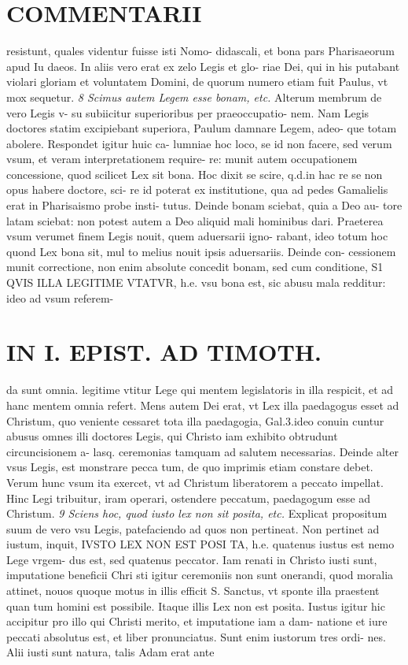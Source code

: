 \documentclass{article}
\begin{document}
\begin{pages}
\section*{COMMENTARII }\pstart resistunt, quales videntur fuisse isti Nomo- didascali, et bona pars Pharisaeorum apud Iu daeos. In aliis vero erat ex zelo Legis et glo- riae Dei, qui in his putabant violari gloriam et voluntatem Domini, de quorum numero etiam fuit Paulus, vt mox sequetur.  \pend
\textit{8 Scimus autem Legem esse bonam, etc. }\pstart Alterum membrum de vero Legis v- su subiicitur superioribus per praeoccupatio- nem. Nam Legis doctores statim excipiebant superiora, Paulum damnare Legem, adeo- que totam abolere. Respondet igitur huic ca- lumniae hoc loco, se id non facere, sed verum vsum, et veram interpretationem require- re: munit autem occupationem concessione, quod scilicet Lex sit bona. Hoc dixit se scire, q.d.in hac re se non opus habere doctore, sci- re id poterat ex institutione, qua ad pedes Gamalielis erat in Pharisaismo probe insti- tutus. Deinde bonam sciebat, quia a Deo au- tore latam sciebat: non potest autem a Deo aliquid mali hominibus dari. Praeterea vsum verumet finem Legis nouit, quem aduersarii igno- rabant, ideo totum hoc quond Lex bona sit, mul to melius nouit ipsis aduersariis. Deinde con- cessionem munit correctione, non enim absolute concedit bonam, sed cum conditione, S1 QVIS ILLA LEGITIME VTATVR, h.e. vsu bona est, sic abusu mala redditur: ideo ad vsum referem-  \pend
\section*{IN I. EPIST. AD TIMOTH. }
\marginpar{[ p.27 ]}\pstart da sunt omnia. legitime vtitur Lege qui mentem legislatoris in illa respicit, et ad hanc mentem omnia refert. Mens autem Dei erat, vt Lex illa paedagogus esset ad Christum, quo veniente cessaret tota illa paedagogia, Gal.3.ideo conuin cuntur abusus omnes illi doctores Legis, qui Christo iam exhibito obtrudunt circuncisionem a- lasq. ceremonias tamquam ad salutem necessarias. Deinde alter vsus Legis, est monstrare pecca tum, de quo imprimis etiam constare debet. Verum hunc vsum ita exercet, vt ad Christum liberatorem a peccato impellat. Hinc Legi tribuitur, iram operari, ostendere peccatum, paedagogum esse ad Christum.  \pend
\textit{9 Sciens hoc, quod iusto lex non sit posita, etc. }\pstart Explicat propositum suum de vero vsu Legis, patefaciendo ad quos non pertineat. Non pertinet ad iustum, inquit, IVSTO LEX NON EST POSI TA, h.e. quatenus iustus est nemo Lege vrgem- dus est, sed quatenus peccator. Iam renati in Christo iusti sunt, imputatione beneficii Chri sti igitur ceremoniis non sunt onerandi, quod moralia attinet, nouos quoque motus in illis efficit S. Sanctus, vt sponte illa praestent quan tum homini est possibile. Itaque illis Lex non est posita. Iustus igitur hic accipitur pro illo qui Christi merito, et imputatione iam a dam- natione et iure peccati absolutus est, et liber pronunciatus. Sunt enim iustorum tres ordi- nes. Alii iusti sunt natura, talis Adam erat ante  \pend
\marginpar{[ p.28 ]}

\end{pages}
\end{document}
